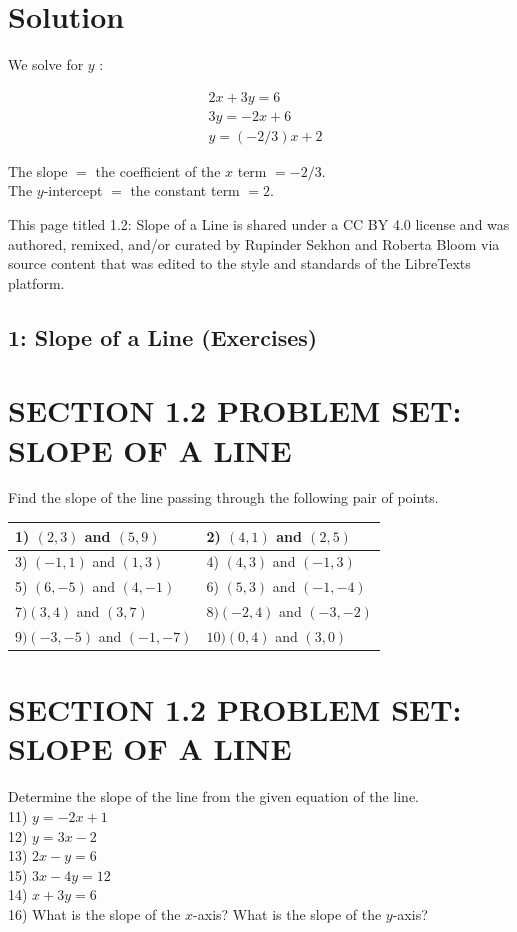 \section*{Solution}
We solve for $y$ :

$$
\begin{aligned}
& 2 x+3 y=6 \\
& 3 y=-2 x+6 \\
& y=(-2 / 3) x+2
\end{aligned}
$$

The slope $=$ the coefficient of the $x$ term $=-2 / 3$.\\
The $y$-intercept $=$ the constant term $=2$.

This page titled 1.2: Slope of a Line is shared under a CC BY 4.0 license and was authored, remixed, and/or curated by Rupinder Sekhon and Roberta Bloom via source content that was edited to the style and standards of the LibreTexts platform.

\subsection*{1: Slope of a Line (Exercises)}
\section*{SECTION 1.2 PROBLEM SET: SLOPE OF A LINE}
Find the slope of the line passing through the following pair of points.

\begin{center}
\begin{tabular}{|l|l|}
\hline
1) $(2,3)$ and $(5,9)$ & 2) $(4,1)$ and $(2,5)$ \\
\hline
3) $(-1,1)$ and $(1,3)$ & 4) $(4,3)$ and $(-1,3)$ \\
\hline
5) $(6,-5)$ and $(4,-1)$ & 6) $(5,3)$ and $(-1,-4)$ \\
\hline
7$)(3,4)$ and $(3,7)$ & $8)(-2,4)$ and $(-3,-2)$ \\
\hline
9$)(-3,-5)$ and $(-1,-7)$ & $10)(0,4)$ and $(3,0)$ \\
\hline
\end{tabular}
\end{center}

\section*{SECTION 1.2 PROBLEM SET: SLOPE OF A LINE}
Determine the slope of the line from the given equation of the line.\\
11) $y=-2 x+1$\\
12) $y=3 x-2$\\
13) $2 x-y=6$\\
15) $3 x-4 y=12$\\
14) $x+3 y=6$\\
16) What is the slope of the $x$-axis? What is the slope of the $y$-axis?

